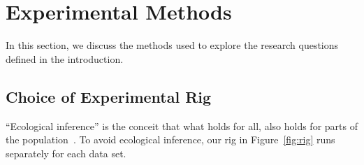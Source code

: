 \documentclass[smallcondesed]{svjour3}
\begin{document}




\section{Experimental Methods} 

In this section, we discuss the methods used to explore the research questions defined
in the introduction.








\subsection{Choice of Experimental Rig}




``Ecological inference''
is the conceit 
that what holds for all, also holds for parts 
of the population~\cite{posnet11,me12d}.
To avoid ecological inference,
our  rig in Figure~\ref{fig:rig}
runs separately for each data set.  
\end{document}

